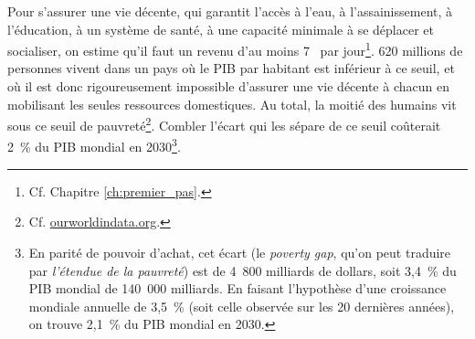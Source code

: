 \documentclass[a5paper,french,openany]{memoir}
\begin{document}
Pour s'assurer une vie décente, qui garantit l'accès à l'eau, à l'assainissement, à l'éducation, à un système de santé, à une capacité minimale à se déplacer et socialiser, on estime qu'il faut un revenu d'au moins 7~\textit{\texteuro{}} par jour\footnote{Cf. Chapitre \ref{ch:premier_pas}.}. 
620 millions de personnes vivent dans un pays où le PIB par habitant est inférieur à ce seuil, et où il est donc rigoureusement impossible d'assurer une vie décente à chacun en mobilisant les seules ressources domestiques. 
Au total, la moitié des humains vit sous ce seuil de pauvreté\footnote{Cf. \href{https://ourworldindata.org/grapher/distribution-of-population-between-different-poverty-thresholds-up-to-30-dollars}{ourworldindata.org}.}. Combler l'écart qui les sépare de ce seuil coûterait 2~\% du PIB mondial en 2030\footnote{En parité de pouvoir d'achat, cet écart (le \textit{poverty gap}, qu'on peut traduire par \textit{l'étendue de la pauvreté}) est de 4~800 milliards de dollars, soit 3,4~\% du PIB mondial de 140~000 milliards. En faisant l'hypothèse d'une croissance mondiale annuelle de 3,5~\% (soit celle observée sur les 20 dernières années), on trouve %
2,1~\% du PIB mondial en 2030.}. %
\end{document}
